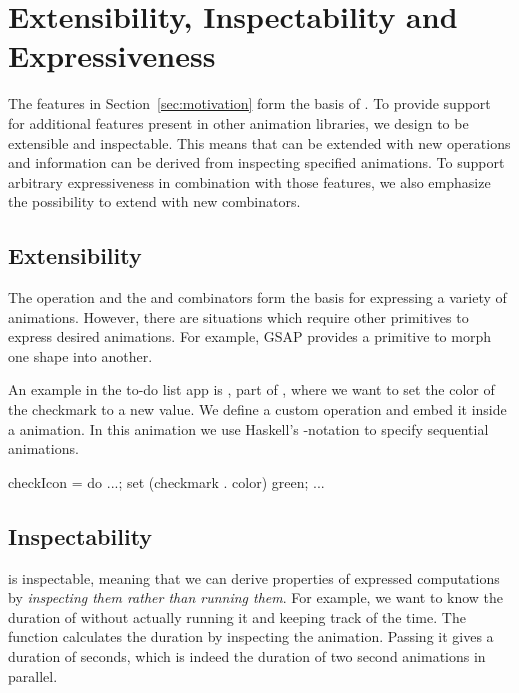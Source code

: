 \section{Extensibility, Inspectability and Expressiveness}
\label{sec:features}

The features in Section~\ref{sec:motivation} form the basis of \dsl{}.
To provide support for additional features present in other animation libraries,
we design \dsl{} to be extensible and
inspectable. This means that \dsl{} can be extended with new
operations and information can be derived from inspecting specified animations.
To support arbitrary expressiveness in combination with those
features, we also emphasize the possibility to extend \dsl{} with new
combinators.

\subsection{Extensibility}
\label{sec:customop}

The  operation and the  and  combinators form the basis for expressing a variety of animations. However, there are situations which require other primitives to express desired animations. For example, GSAP provides a primitive to morph one shape into another.

An example in the to-do list app is , part of , where we want to set the color of the checkmark to a new value. We define a custom  operation and embed it inside a \dsl{} animation. In this animation we use Haskell's -notation to specify sequential animations.

\begin{spec}
checkIcon = do ...; set (checkmark . color) green; ...
\end{spec}


\subsection{Inspectability}

\dsl{} is inspectable, meaning that we can derive properties of expressed computations by \emph{inspecting them rather than running them}. For example, we want to know the duration of  without actually running it and keeping track of the time. The  function calculates the duration by inspecting the animation. Passing it  gives a duration of  seconds, which is indeed the duration of two  second animations in parallel.

